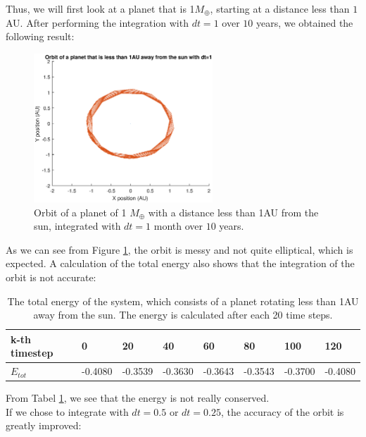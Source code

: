 Thus, we will first look at a planet that is 1$M_{\oplus}$, starting at a distance less than $1$ AU. 
After performing the integration with $dt=1$ over $10$ years, we obtained the following result:

\begin{figure}[H]
\centering
\includegraphics[width=0.6\textwidth]{Planeet_1AU_dt1_10jaar.eps}
\caption{Orbit of a planet of 1 $M_{\oplus}$ with a distance less than 1AU from the sun, integrated with $dt=1$ month over $10$ years.}
    \label{fig:Planet1AUdt1}
\end{figure}

As we can see from Figure \ref{fig:Planet1AUdt1}, the orbit is messy and not quite elliptical, which is expected. 
A calculation of the total energy also shows that the integration of the orbit is not accurate:\\

\begin{table}[htb]
\centering
\caption{The total energy of the system, which consists of a planet rotating less than 1AU away from the sun. The energy is calculated after each 20 time steps.}
\begin{tabular}{|l|l|l|l|l|l|l|l|}
\hline
k-th timestep&0&20&40&60&80&100&120\\ \hline
$E_{tot}$&-0.4080& -0.3539&   -0.3630&   -0.3643&   -0.3543&-0.3700&-0.4080\\ \hline
\end{tabular}
\label{tab:Planet1AUEnergy}
\end{table}

From Tabel \ref{tab:Planet1AUEnergy}, we see that the energy is not really conserved.\\

If we chose to integrate with $dt=0.5$ or $dt=0.25$, the accuracy of the orbit is greatly improved:


